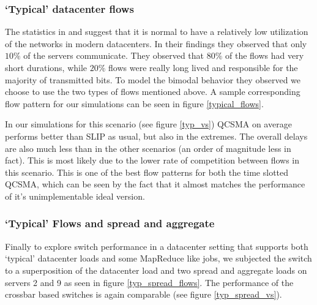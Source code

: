 \documentclass[11pt]{article}%
\begin{document}

\subsubsection{`Typical' datacenter flows}
The statistics in \cite{Benson} and \cite{Kandula} suggest that it is normal to have a relatively low utilization of the networks in modern datacenters.  In their findings they observed that only $10\%$ of the servers communicate.  They observed that $80\%$ of the flows had very short durations, while $20\%$ flows were really long lived and responsible for the majority of transmitted bits.  To model the bimodal behavior they observed we choose to use the two types of flows mentioned above.  A sample corresponding flow pattern for our simulations can be seen in figure \ref{typical_flows}.


In our simulations for this scenario (see figure \ref{typ_vs}) QCSMA on average performs better than SLIP as usual, but also in the extremes.  The overall delays are also much less than in the other scenarios (an order of magnitude less in fact).  This is most likely due to the lower rate of competition between flows in this scenario.  This is one of the best flow patterns for both the time slotted QCSMA, which can be seen by the fact that it almost matches the performance of it's unimplementable ideal version.

%

\subsubsection{`Typical' Flows and spread and aggregate}
Finally to explore switch performance in a datacenter setting that supports both  `typical' datacenter loads and some MapReduce like jobs, we subjected the switch to a superposition of the datacenter load and two spread and aggregate loads on servers 2 and 9 as seen in figure \ref{typ_spread_flows}.  The performance of the crossbar based switches is again comparable (see figure \ref{typ_spread_vs}).
\end{document}
